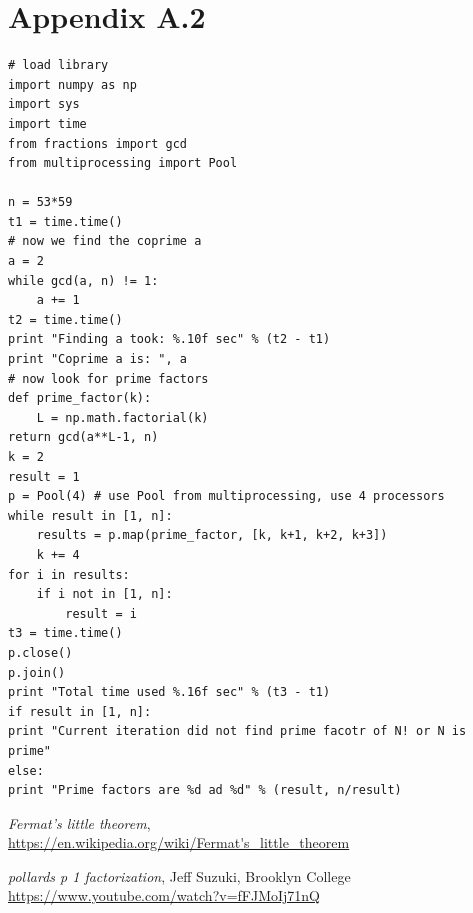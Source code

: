 \documentclass[10pt]{article}
\begin{document}
\section*{Appendix A.2}
\begin{verbatim}
# load library
import numpy as np
import sys
import time
from fractions import gcd
from multiprocessing import Pool

n = 53*59
t1 = time.time()
# now we find the coprime a
a = 2
while gcd(a, n) != 1:
    a += 1
t2 = time.time()
print "Finding a took: %.10f sec" % (t2 - t1)
print "Coprime a is: ", a
# now look for prime factors
def prime_factor(k):
    L = np.math.factorial(k)
return gcd(a**L-1, n)
k = 2
result = 1
p = Pool(4) # use Pool from multiprocessing, use 4 processors
while result in [1, n]:
    results = p.map(prime_factor, [k, k+1, k+2, k+3])
    k += 4
for i in results:
    if i not in [1, n]:
        result = i
t3 = time.time()
p.close()
p.join()
print "Total time used %.16f sec" % (t3 - t1)
if result in [1, n]:
print "Current iteration did not find prime facotr of N! or N is prime"
else:
print "Prime factors are %d ad %d" % (result, n/result)
\end{verbatim}


\newpage
\begin{thebibliography}{9}
	\textit{Fermat's little theorem},\\
	\url{https://en.wikipedia.org/wiki/Fermat's_little_theorem}
	
	\textit{pollards p 1 factorization}, Jeff Suzuki, Brooklyn College\\
	\url{https://www.youtube.com/watch?v=fFJMoIj71nQ}
\end{thebibliography}
\end{document}
